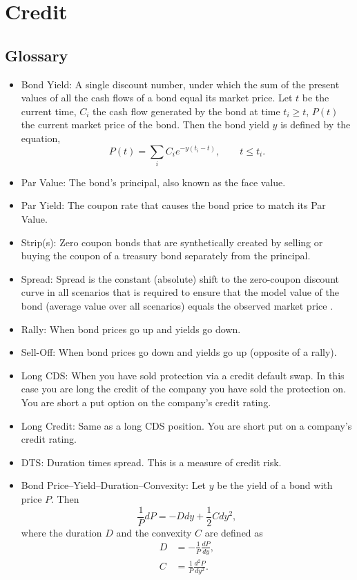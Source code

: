 \documentclass{amsart}
\theoremstyle{plain}
\numberwithin{equation}{section}
\begin{document}
\section{Credit}
\subsection{Glossary}
\begin{itemize}
\item Bond Yield: A single discount number, under which
the sum of the present values of all the cash flows of a bond equal 
its market price. Let $t$ be the current time, $C_i$ the cash flow generated by the bond at
time $t_i \geq t$, $P(t)$ the current market price of the bond. Then the bond yield
$y$ is defined by the equation,
\begin{equation}
P(t) = \sum_{i} C_i e^{- y (t_i - t )}, \qquad t \leq t_i.
\label{eq:bond_yield}
\end{equation}
\item Par Value: The bond's principal, also known as the face value. 
\item Par Yield: The coupon rate that causes the bond price to match 
its Par Value.
\item Strip(s): Zero coupon bonds that are synthetically created by 
selling or buying the coupon of a treasury bond separately from the principal.
\item Spread: Spread is the constant (absolute) shift to the zero-coupon discount curve in all scenarios that is required to ensure that the model value of the bond (average value over all scenarios) equals the observed market price \cite{dor2007dtssm}.
\item Rally: When bond prices go up and yields go down.
\item Sell-Off: When bond prices go down and yields go up (opposite of a rally).
\item Long CDS: When you have sold protection via a credit default swap. In this 
case you are long the credit of the company you have sold the protection on. You 
are short a put option on the company's credit rating. 
\item Long Credit: Same as a long CDS position. You are short put on a 
company's credit rating.
\item DTS: Duration times spread. This is a measure of credit risk.
\item Bond Price--Yield--Duration--Convexity:
Let $y$ be the yield of a bond with price $P$. Then  
\begin{equation}
\frac{1}{P} dP = -D dy + \frac{1}{2} C dy^2,
\end{equation}
where the duration $D$ and the convexity 
$C$ are defined as
\begin{align*}
D &= -\frac{1}{P}\frac{dP}{dy},\\
C &=  \frac{1}{P}\frac{d^2P}{dy^2}.
\end{align*}


\end{itemize}
\end{document}
